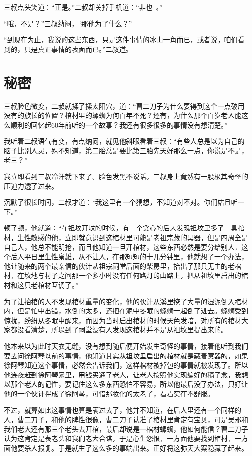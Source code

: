 三叔点头笑道：“正是。”二叔却关掉手机道：“非也~。”

“哦，不是？”三叔纳闷，“那他为了什么？”

“到现在为止，我说的这些东西，只是这件事情的冰山一角而已，或者说，咱们看到的，只是真正事情的表面而已。”二叔道。

\chapter{秘密}

三叔脸色微变，二叔就揉了揉太阳穴，道：“曹二刀子为什么要得到这个一点破用没有的族长的位置？棺材里的螺蛳为何百年不死？还有，为什么那个百岁老人能这么顺利的回忆起60年前听的一个故事？我还有很多很多的事情没有想清楚。”

我听着二叔语气有变，有点纳闷，就见他斜眼看着三叔：“有些人总是以为自己的脑子比别人灵，殊不知道，第二胎总是要比第三胎先天好那么一点，你说是不是，老三？”

我立即看到三叔冷汗就下来了。脸色发黑不说话。二叔身上竟然有一股极其奇怪的压迫力透了过来。

沉默了很长时间，二叔才道：“我这里有一个猜想，不知道对不对。你们姑且听一下。”

顿了顿，他就道：“在祖坟开坟的时候，有一个贪心的后人发现祖坟里多了一具棺材，生性敏感的他，立即就意识到这棺材里可能是老祖宗藏的冥器，但是四周全是自己人，他总不能明抢，而且他知道一旦开棺材，这些东西必然是要分给别人，这个后人平日里生性枭雄，从不让人，在那短短的十几分钟里，他就想了一个办法，他让随来的两个最亲信的伙计从祖宗祠堂后面的柴房里，抬出了那只无主的老棺材，在坟地与村子之间那一个多小时没有任何路灯的山路上，把从祖坟里启出的棺材和这只老棺材互调了。”

为了让抬棺的人不发现棺材重量的变化，他的伙计从溪里挖了大量的湿泥倒入棺材内，但是忙中出错，水倒的太多，还把在泥中冬眠的螺蛳一起倒了进去。螺蛳受到惊扰，纷纷从冬眠中醒来，而因为当时启出棺材的时候天色发暗，对所有的棺材大家都没看清楚，所以到了祠堂没有人发现这棺材并不是从祖坟里提出来的。

他本来以为此时天衣无缝，没有想到随后便开始发生奇怪的事情，接着他听到我们要去问徐阿琴以前的事情，他知道其实从祖坟里启出的棺材就是藏着冥器的，如果徐阿琴知道这个事情，必然会告诉我们，这样棺材被掉包的事情就被发现了。所以他连夜赶到徐阿琴家里，用钱买通了老人，让老人按照他实现编好的稿子念，我想以那个老人的记性，要记住这么多东西恐怕不容易，所以他最后没了办法，只好让他的一个伙计拌成了徐阿琴，可惜那妆化的太老了，看着实在不舒服。

不过，就算如此这事情也算是瞒过去了，他并不知道，在后人里还有一个同样的人，曹二刀子，和他的脾性很像，曹二刀子认准了棺材里肯定有宝贝，可是吴邪和我们老大还有那三个老头去开棺，最后却说是一棺材螺蛳，他如何能信？曹二刀子认为这肯定是表老头和我们老大合谋，于是心生怨恨，一方面他要找到棺材，一方面他要杀人报复。于是就生了这么多的事端出来。正好将这弥天大案隐藏了起来。


